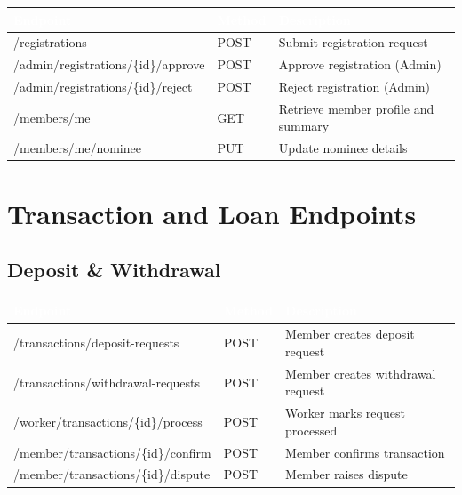 \documentclass[11pt,a4paper]{article}
\begin{document}
\begin{longtable}{@{}>{\ttfamily}p{}p{}p{}@{}}
\toprule
\rowcolor{primaryblue}
\textcolor{white}{\normalfont\textbf{Endpoint}} & \textcolor{white}{\textbf{Method}} & \textcolor{white}{\textbf{Description}} \\
\midrule
\endhead
/registrations & POST & Submit registration request \\
\midrule
/admin/registrations/\{id\}/approve & POST & Approve registration (Admin) \\
\midrule
/admin/registrations/\{id\}/reject & POST & Reject registration (Admin) \\
\midrule
/members/me & GET & Retrieve member profile and summary \\
\midrule
/members/me/nominee & PUT & Update nominee details \\
\bottomrule
\end{longtable}

\section{Transaction and Loan Endpoints}

\subsection{Deposit \& Withdrawal}

\begin{longtable}{@{}>{\ttfamily}p{}p{}p{}@{}}
\toprule
\rowcolor{primaryblue}
\textcolor{white}{\normalfont\textbf{Endpoint}} & \textcolor{white}{\textbf{Method}} & \textcolor{white}{\textbf{Description}} \\
\midrule
\endhead
/transactions/deposit-requests & POST & Member creates deposit request \\
\midrule
/transactions/withdrawal-requests & POST & Member creates withdrawal request \\
\midrule
/worker/transactions/\{id\}/process & POST & Worker marks request processed \\
\midrule
/member/transactions/\{id\}/confirm & POST & Member confirms transaction \\
\midrule
/member/transactions/\{id\}/dispute & POST & Member raises dispute \\
\bottomrule
\end{longtable}
\end{document}
